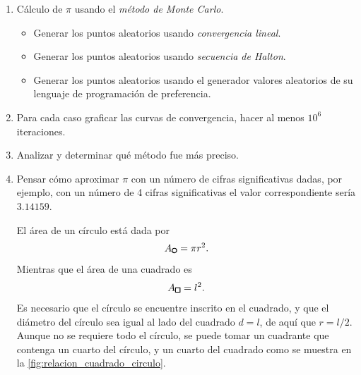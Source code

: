 \begin{enumerate}
    \item Cálculo de $\pi$ usando el \textit{método de Monte Carlo}.
    \begin{itemize}
        \item Generar los puntos aleatorios usando \textit{convergencia lineal}.
        \item Generar los puntos aleatorios usando \textit{secuencia de Halton}.
        \item Generar los puntos aleatorios usando el generador valores aleatorios de su lenguaje de programación de preferencia.
    \end{itemize}

    \item Para cada caso graficar las curvas de convergencia, hacer al menos $10^6$ iteraciones.
    \item Analizar y determinar qué método fue más preciso.
    \item Pensar cómo aproximar $\pi$ con un número de cifras significativas dadas, por ejemplo, con un número de 4 cifras significativas el valor correspondiente sería $3.14159$.
    \begin{solution}
        El área de un círculo está dada por
        \begin{equation*}
            A_{\circlefig} = \pi r^2 .
        \end{equation*}
        Mientras que el área de una cuadrado es
        \begin{equation*}
            A_{\squarefig} = l^2 .
        \end{equation*}
        Es necesario que el círculo se encuentre inscrito en el cuadrado, y que el diámetro del círculo sea igual al lado del cuadrado $d = l$, de aquí que $r = l/2$. Aunque no se requiere todo el círculo, se puede tomar un cuadrante que contenga un cuarto del círculo, y un cuarto del cuadrado como se muestra en la \cref{fig:relacion_cuadrado_circulo}.


\end{solution}
\end{enumerate}
